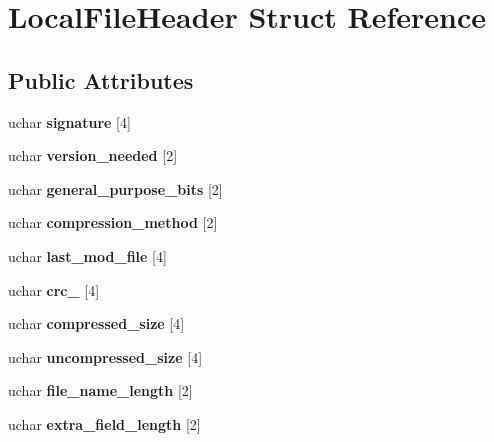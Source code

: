 \hypertarget{struct_local_file_header}{}\section{Local\+File\+Header Struct Reference}
\label{struct_local_file_header}
\subsection*{Public Attributes}
\begin{DoxyCompactItemize}
\item 
\mbox{\label{struct_local_file_header_ab20bdaca671c5afd72681b74ec03a713}} 
uchar {\bfseries signature} \mbox{[}4\mbox{]}
\item 
\mbox{\label{struct_local_file_header_ac2b95e483d255594e114b02ae572f387}} 
uchar {\bfseries version\+\_\+needed} \mbox{[}2\mbox{]}
\item 
\mbox{\label{struct_local_file_header_a62348719f6b17a3363a929dc035074e7}} 
uchar {\bfseries general\+\_\+purpose\+\_\+bits} \mbox{[}2\mbox{]}
\item 
\mbox{\label{struct_local_file_header_a3f1e7466e42d2bbe6edcc2f685c9a96a}} 
uchar {\bfseries compression\+\_\+method} \mbox{[}2\mbox{]}
\item 
\mbox{\label{struct_local_file_header_ac4184823d4505cc2e9f6c2d82cf96fe7}} 
uchar {\bfseries last\+\_\+mod\+\_\+file} \mbox{[}4\mbox{]}
\item 
\mbox{\label{struct_local_file_header_a99281b3d86049a5dce9f37f25af63385}} 
uchar {\bfseries crc\+\_} \mbox{[}4\mbox{]}
\item 
\mbox{\label{struct_local_file_header_ac60df0d84c94451e2715c8220e089616}} 
uchar {\bfseries compressed\+\_\+size} \mbox{[}4\mbox{]}
\item 
\mbox{\label{struct_local_file_header_af9640bdf1f5205907622e74edd39f662}} 
uchar {\bfseries uncompressed\+\_\+size} \mbox{[}4\mbox{]}
\item 
\mbox{\label{struct_local_file_header_a0e06840d1bf035bd6eb6c3d574cc0eff}} 
uchar {\bfseries file\+\_\+name\+\_\+length} \mbox{[}2\mbox{]}
\item 
\mbox{\label{struct_local_file_header_abc0df41a6acf4339e0b9fcc0f2f2f07e}} 
uchar {\bfseries extra\+\_\+field\+\_\+length} \mbox{[}2\mbox{]}
\end{DoxyCompactItemize}


